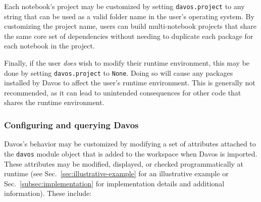 \documentclass[preprint,12pt,a4paper]{elsarticle}
\begin{document}
Each notebook's project may be customized by setting \texttt{davos.project} to
any string that can be used as a valid folder name in the user's operating
system. By customizing the project name, users can build multi-notebook
projects that share the same core set of dependencies without needing to
duplicate each package for each notebook in the project.

Finally, if the user \textit{does} wish to modify their runtime environment,
this may be done by setting \texttt{davos.project} to \texttt{None}. Doing so
will cause any packages installed by Davos to affect the user's
runtime environment.  This is generally not recommended, as it can lead to
unintended consequences for other code that shares the runtime environment.


\subsubsection{Configuring and querying Davos}\label{subsec:config}

Davos's behavior may be customized by modifying a set of attributes attached to
the \texttt{davos} module object that is added to the workspace when Davos is
imported. These attributes may be modified, displayed, or checked
programmatically at runtime (see Sec.~\ref{sec:illustrative-example} for an
illustrative example or Sec.~\ref{subsec:implementation} for implementation
details and additional information). These include:
\end{document}
